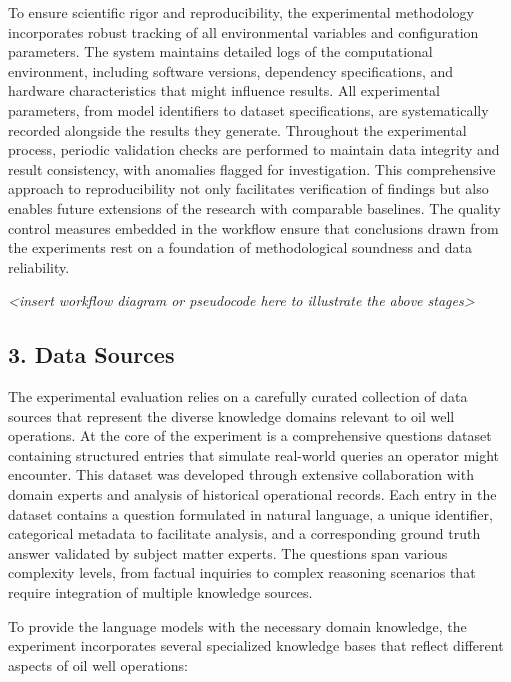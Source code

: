             To ensure scientific rigor and reproducibility, the experimental methodology incorporates robust tracking of all environmental variables and configuration parameters. The system maintains detailed logs of the computational environment, including software versions, dependency specifications, and hardware characteristics that might influence results. All experimental parameters, from model identifiers to dataset specifications, are systematically recorded alongside the results they generate. Throughout the experimental process, periodic validation checks are performed to maintain data integrity and result consistency, with anomalies flagged for investigation. This comprehensive approach to reproducibility not only facilitates verification of findings but also enables future extensions of the research with comparable baselines. The quality control measures embedded in the workflow ensure that conclusions drawn from the experiments rest on a foundation of methodological soundness and data reliability.

            \textit{<insert workflow diagram or pseudocode here to illustrate the above stages>}

        \subsection{3. Data Sources}

            The experimental evaluation relies on a carefully curated collection of data sources that represent the diverse knowledge domains relevant to oil well operations. At the core of the experiment is a comprehensive questions dataset containing structured entries that simulate real-world queries an operator might encounter. This dataset was developed through extensive collaboration with domain experts and analysis of historical operational records. Each entry in the dataset contains a question formulated in natural language, a unique identifier, categorical metadata to facilitate analysis, and a corresponding ground truth answer validated by subject matter experts. The questions span various complexity levels, from factual inquiries to complex reasoning scenarios that require integration of multiple knowledge sources.

            To provide the language models with the necessary domain knowledge, the experiment incorporates several specialized knowledge bases that reflect different aspects of oil well operations:

